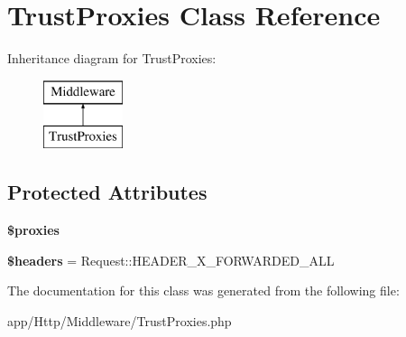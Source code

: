 \hypertarget{class_app_1_1_http_1_1_middleware_1_1_trust_proxies}{}\section{Trust\+Proxies Class Reference}
\label{class_app_1_1_http_1_1_middleware_1_1_trust_proxies}
Inheritance diagram for Trust\+Proxies\+:\begin{figure}[H]
\begin{center}
\leavevmode
\includegraphics[height=2.000000cm]{class_app_1_1_http_1_1_middleware_1_1_trust_proxies}
\end{center}
\end{figure}
\subsection*{Protected Attributes}
\begin{DoxyCompactItemize}
\item 
\mbox{\label{class_app_1_1_http_1_1_middleware_1_1_trust_proxies_a9fed7e7c82160e6b32d7ed4c8193c195}} 
{\bfseries \$proxies}
\item 
\mbox{\label{class_app_1_1_http_1_1_middleware_1_1_trust_proxies_a52500036ee807241b8b4b7e2367c49ef}} 
{\bfseries \$headers} = Request\+::\+H\+E\+A\+D\+E\+R\+\_\+\+X\+\_\+\+F\+O\+R\+W\+A\+R\+D\+E\+D\+\_\+\+A\+LL
\end{DoxyCompactItemize}


The documentation for this class was generated from the following file\+:\begin{DoxyCompactItemize}
\item 
app/\+Http/\+Middleware/Trust\+Proxies.\+php\end{DoxyCompactItemize}
